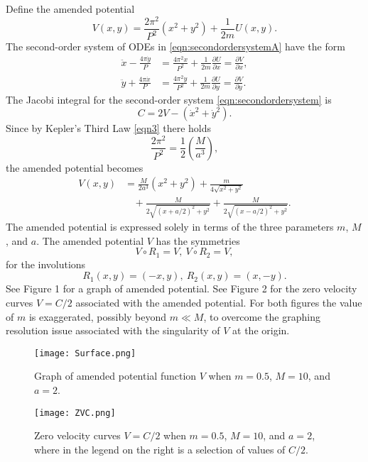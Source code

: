 \documentclass[12pt]{article}
\begin{document}
Define the amended potential
\begin{equation}\label{eqn:UandV}
V(x,y) = \frac{2\pi^2}{P^2}(x^2 + y^2) + \frac{1}{2m}U(x,y).
\end{equation}
The second-order system of ODEs in \eqref{eqn:secondordersystemA} have the form
\begin{equation}\label{eqn:secondordersystem}
\begin{aligned}
\ddot x - \frac{4\pi \dot y}{P} & = \frac{4\pi^2 x}{P^2} + \frac{1}{2m} \frac{\partial U}{\partial x} = \frac{\partial V}{\partial x}, \\
\ddot y + \frac{4\pi \dot x}{P} & =  \frac{4\pi^2 y}{P^2} + \frac{1}{2m} \frac{\partial U}{\partial y} = \frac{\partial V}{\partial y}.
\end{aligned}
\end{equation}
The Jacobi integral for the second-order system \eqref{eqn:secondordersystem} is
\[ C = 2V - (\dot x^2 + \dot y^2).\]
Since by Kepler's Third Law \eqref{eqn3} there holds
\[ \frac{2\pi^2}{P^2} = \frac{1}{2}\left( \frac{M}{a^3}\right),\]
the amended potential becomes
\begin{align*}
V(x,y) & = \frac{M}{2a^3}(x^2+y^2) + \frac{m}{4\sqrt{x^2+y^2}} \\ 
& \ \ \ \ + \frac{M}{ 2\sqrt{ (x + a/2)^2 + y^2}} +  \frac{M}{2 \sqrt{ (x - a/2)^2 + y^2}}.
\end{align*}
The amended potential is expressed solely in terms of the three parameters $m$, $M$, and $a$. The amended potential $V$ has the symmetries
\begin{equation}\label{Vsymmetries}
V\circ R_1  = V,\ V\circ R_2 = V,
\end{equation}
for the involutions
\[ R_1(x,y) = (-x,y),\ R_2(x,y) = (x,-y).\]
See Figure 1 for a graph of amended potential. See Figure 2 for the zero velocity curves $V=C/2$ associated with the amended potential. For both figures the value of $m$ is exaggerated, possibly beyond $m\ll M$, to overcome the graphing resolution issue associated with the singularity of $V$ at the origin.


\begin{figure}[ht]%
\centering
\texttt{[image: Surface.png]}
\caption{Graph of amended potential function $V$ when $m=0.5$, $M=10$, and $a=2$.}\label{fig0A}
\end{figure}

\begin{figure}[ht]%
\centering
\texttt{[image: ZVC.png]}
\caption{Zero velocity curves $V = C/2$ when $m=0.5$, $M=10$, and $a=2$, where in the legend on the right is a selection of values of $C/2.$}\label{fig0B}
\end{figure}
\end{document}
